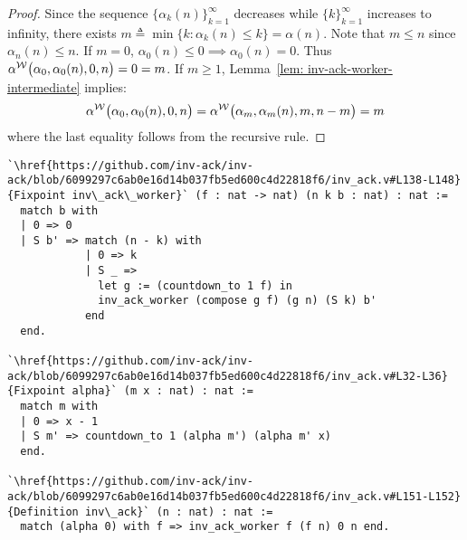 \begin{proof} %
	Since the sequence $\big\{\alpha_k(n)\big\}_{k=1}^{\infty}$ decreases while $\{k\}_{k=1}^{\infty}$ increases to infinity, there exists $m \triangleq \min\big\{k : \alpha_k(n) \le k \} = \alpha(n)$. Note that $m\le n$ since $\alpha_n(n)\le n$.
	If $m = 0$, $\alpha_0(n)\le 0 \!\! \implies \!\! \alpha_0(n) = 0$. Thus $\alpha^{\mathcal{W}}\big(\alpha_0, \alpha_0(n), 0, n\big) = 0 = m$. If $m \ge 1$, Lemma~\ref{lem: inv-ack-worker-intermediate} implies:
	$$ \alpha^{\mathcal{W}}\big(\alpha_0, \alpha_0(n), 0, n\big) = \alpha^{\mathcal{W}}\big(\alpha_m, \alpha_m(n), m, n - m\big) = m $$
	where the last equality follows from the recursive rule.
\end{proof}
\begin{lstlisting}
`\href{https://github.com/inv-ack/inv-ack/blob/6099297c6ab0e16d14b037fb5ed600c4d22818f6/inv_ack.v#L138-L148} {Fixpoint inv\_ack\_worker}` (f : nat -> nat) (n k b : nat) : nat :=
  match b with
  | 0 => 0
  | S b' => match (n - k) with
            | 0 => k
            | S _ =>
              let g := (countdown_to 1 f) in 
              inv_ack_worker (compose g f) (g n) (S k) b'
            end
  end.

`\href{https://github.com/inv-ack/inv-ack/blob/6099297c6ab0e16d14b037fb5ed600c4d22818f6/inv_ack.v#L32-L36}{Fixpoint alpha}` (m x : nat) : nat :=
  match m with
  | 0 => x - 1
  | S m' => countdown_to 1 (alpha m') (alpha m' x)
  end.
  
`\href{https://github.com/inv-ack/inv-ack/blob/6099297c6ab0e16d14b037fb5ed600c4d22818f6/inv_ack.v#L151-L152}{Definition inv\_ack}` (n : nat) : nat :=
  match (alpha 0) with f => inv_ack_worker f (f n) 0 n end.
\end{lstlisting}


